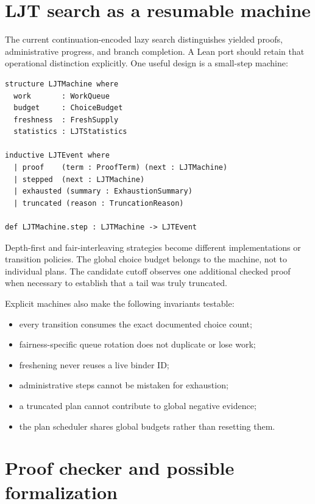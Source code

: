 \documentclass[10pt,letterpaper,oneside]{report}
\newcommand{\code}[1]{\texttt{\detokenize{#1}}}
\begin{document}
\section{LJT search as a resumable machine}

The current continuation-encoded lazy search distinguishes yielded proofs, administrative progress, and branch completion. A Lean port should retain that operational distinction explicitly. One useful design is a small-step machine:

\begin{lstlisting}[language=Leanish]
structure LJTMachine where
  work       : WorkQueue
  budget     : ChoiceBudget
  freshness  : FreshSupply
  statistics : LJTStatistics

inductive LJTEvent where
  | proof    (term : ProofTerm) (next : LJTMachine)
  | stepped  (next : LJTMachine)
  | exhausted (summary : ExhaustionSummary)
  | truncated (reason : TruncationReason)

def LJTMachine.step : LJTMachine -> LJTEvent
\end{lstlisting}

Depth-first and fair-interleaving strategies become different \code{WorkQueue} implementations or transition policies. The global choice budget belongs to the machine, not to individual plans. The candidate cutoff observes one additional checked proof when necessary to establish that a tail was truly truncated.

Explicit machines also make the following invariants testable:

\begin{itemize}
  \item every transition consumes the exact documented choice count;
  \item fairness-specific queue rotation does not duplicate or lose work;
  \item freshening never reuses a live binder ID;
  \item administrative steps cannot be mistaken for exhaustion;
  \item a truncated plan cannot contribute to global negative evidence;
  \item the plan scheduler shares global budgets rather than resetting them.
\end{itemize}

\section{Proof checker and possible formalization}
\end{document}
